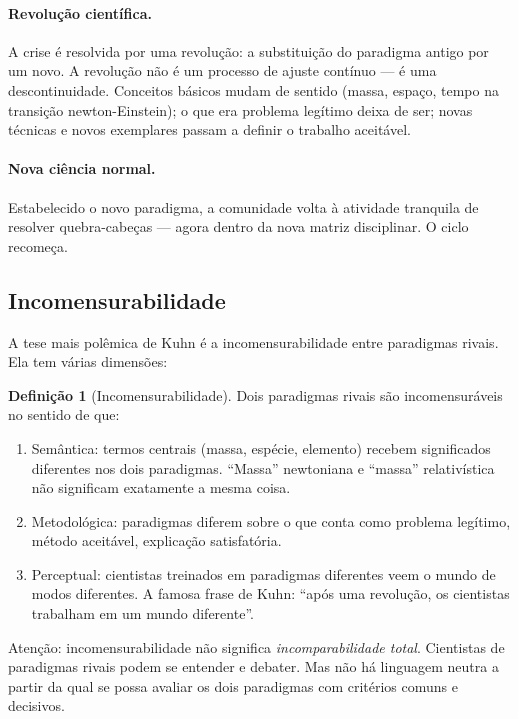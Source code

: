 \documentclass[9pt,a4paper]{extarticle}
\newcommand{\impt}[1]{\textcolor{important}{#1}}
\newcommand{\ntc}[1]{\textcolor{notice}{#1}}
\theoremstyle{definition}
\newtheorem{definition}{Definição}[section]
\begin{document}
\paragraph{Revolução científica.}
A crise é resolvida por uma \impt{revolução}: a substituição do paradigma antigo por um novo. A revolução não é um processo de ajuste contínuo --- é uma \impt{descontinuidade}. Conceitos básicos mudam de sentido (massa, espaço, tempo na transição newton-Einstein); o que era problema legítimo deixa de ser; novas técnicas e novos exemplares passam a definir o trabalho aceitável.

\paragraph{Nova ciência normal.}
Estabelecido o novo paradigma, a comunidade volta à atividade tranquila de resolver quebra-cabeças --- agora dentro da nova matriz disciplinar. O ciclo recomeça.

\subsection{Incomensurabilidade}

A tese mais polêmica de Kuhn é a \impt{incomensurabilidade} entre paradigmas rivais. Ela tem várias dimensões:

\begin{definition}[Incomensurabilidade]
Dois paradigmas rivais são \impt{incomensuráveis} no sentido de que:
\begin{enumerate}
  \item \impt{Semântica:} termos centrais (massa, espécie, elemento) recebem significados diferentes nos dois paradigmas. ``Massa'' newtoniana e ``massa'' relativística não significam exatamente a mesma coisa.
  \item \impt{Metodológica:} paradigmas diferem sobre o que conta como problema legítimo, método aceitável, explicação satisfatória.
  \item \impt{Perceptual:} cientistas treinados em paradigmas diferentes \impt{veem o mundo de modos diferentes}. A famosa frase de Kuhn: ``após uma revolução, os cientistas trabalham em um mundo diferente''.
\end{enumerate}
\end{definition}

\ntc{Atenção:} incomensurabilidade não significa \emph{incomparabilidade total}. Cientistas de paradigmas rivais podem se entender e debater. Mas não há linguagem neutra a partir da qual se possa avaliar os dois paradigmas com critérios comuns e decisivos.
\end{document}
